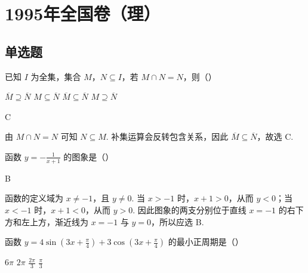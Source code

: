 \documentclass[UTF8,a4paper,oneside,11pt]{ctexbook}
\begin{document}
\mainmatter

\chapter{1995年全国卷（理）}
\section{单选题}

\begin{problem}
已知 \(I\) 为全集，集合 \(M\)，\(N \subseteq I\)，若 \(M \cap N = N\)，则（\quad）

\choices
    {\(\overline{M} \supseteq \overline{N}\)}
    {\(M \subseteq \overline{N}\)}
    {\(\overline{M} \subseteq \overline{N}\)}
    {\(M \supseteq \overline{N}\)}
\end{problem}

\begin{answer}
C
\end{answer}

\begin{solution}
由 \(M\cap N=N\) 可知 \(N\subseteq M\). 补集运算会反转包含关系，因此 \(\overline{M}\subseteq\overline{N}\)，故选 C.
\end{solution}

\begin{problem}
函数 \(y = -\frac{1}{x + 1} \) 的图象是（\quad）

\choices
    {}
    {}
    {}
    {}
\end{problem}

\begin{answer}
B
\end{answer}

\begin{solution}
函数的定义域为 \(x\ne-1\)，且 \(y\ne0\). 当 \(x>-1\) 时，\(x+1>0\)，从而 \(y<0\)；当 \(x<-1\) 时，\(x+1<0\)，从而 \(y>0\). 因此图象的两支分别位于直线 \(x=-1\) 的右下方和左上方，渐近线为 \(x=-1\) 与 \(y=0\)，所以应选 B.
\end{solution}

\begin{problem}
函数 \(y = 4\sin \left(3x + \frac{\pi}{4}\right) + 3\cos \left(3x + \frac{\pi}{4}\right) \) 的最小正周期是（\quad）

\choices
    {\(6\pi\)}
    {\(2\pi\)}
    {\(\frac{2\pi}{3} \)}
    {\(\frac{\pi}{3} \)}
\end{problem}
\end{document}
